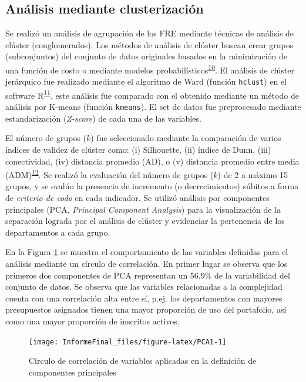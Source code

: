 \documentclass[
]{book}
\begin{document}
\hypertarget{anuxe1lisis-mediante-clusterizaciuxf3n}{%
\subsection{Análisis mediante clusterización}\label{anuxe1lisis-mediante-clusterizaciuxf3n}}

Se realizó un análisis de agrupación de los FRE mediante técnicas de análisis de clúster (conglomerados). Los métodos de análisis de clúster buscan crear grupos (subconjuntos) del conjunto de datos originales basados en la minimización de una función de costo o mediante modelos probabilísticos\textsuperscript{\protect\hyperlink{ref-Hennig2016}{10}}. El análisis de clúster jerárquico fue realizado mediante el algoritmo de Ward (función \texttt{hclust}) en el software R\textsuperscript{\protect\hyperlink{ref-R_Stats}{11}}, este análisis fue comparado con el obtenido mediante un método de análisis por K-means (función \texttt{kmeans}). El set de datos fue preprocesado mediante estandarización (\emph{Z-score}) de cada una de las variables.

El número de grupos (\(k\)) fue seleccionado mediante la comparación de varios índices de validez de clúster como: (i) Silhouette, (ii) índice de Dunn, (iii) conectividad, (iv) distancia promedio (AD), o (v) distancia promedio entre media (ADM)\textsuperscript{\protect\hyperlink{ref-R_clValid}{12}}. Se realizó la evaluación del número de grupos (\(k\)) de 2 a máximo 15 grupos, y se evalúo la presencia de incremento (o decrecimientos) súbitos a forma de \emph{criterio de codo} en cada indicador. Se utilizó análisis por componentes principales (PCA, \emph{Principal Component Analysis}) para la visualización de la separación lograda por el análisis de clúster y evidenciar la pertenencia de los departamentos a cada grupo.

En la Figura \ref{fig:PCA1} se muestra el comportamiento de las variables definidas para el análisis mediante un círculo de correlación. En primer lugar se observa que los primeros dos componentes de PCA representan un 56.9\% de la variabilidad del conjunto de datos. Se observa que las variables relacionadas a la complejidad cuenta con una correlación alta entre sí, p.ej. los departamentos con mayores presupuestos asignados tienen una mayor proporción de uso del portafolio, así como una mayor proporción de inscritos activos.

\begin{figure}[t]

{\centering \texttt{[image: InformeFinal\_files/figure-latex/PCA1-1]} 

}

\caption{Círculo de correlación de variables aplicadas en la definición de componentes principales}\label{fig:PCA1}
\end{figure}
\end{document}
